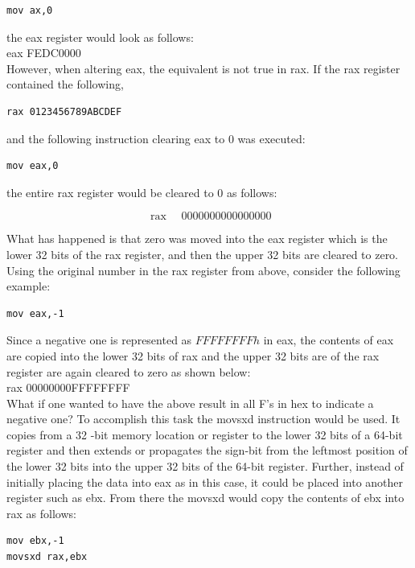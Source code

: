 \documentclass[10pt]{book}
\begin{document}
\begin{verbatim}
mov ax,0
\end{verbatim}

the eax register would look as follows:\\
eax FEDC0000\\
However, when altering eax, the equivalent is not true in rax. If the rax register contained the following,

\begin{verbatim}
rax 0123456789ABCDEF
\end{verbatim}

and the following instruction clearing eax to 0 was executed:

\begin{verbatim}
mov eax,0
\end{verbatim}

the entire rax register would be cleared to 0 as follows:

$$
\text { rax } \quad 0000000000000000
$$

What has happened is that zero was moved into the eax register which is the lower 32 bits of the rax register, and then the upper 32 bits are cleared to zero. Using the original number in the rax register from above, consider the following example:

\begin{verbatim}
mov eax,-1
\end{verbatim}

Since a negative one is represented as $F F F F F F F F h$ in eax, the contents of eax are copied into the lower 32 bits of rax and the upper 32 bits are of the rax register are again cleared to zero as shown below:\\
rax 00000000FFFFFFFF\\
What if one wanted to have the above result in all F's in hex to indicate a negative one? To accomplish this task the movsxd instruction would be used. It copies from a 32 -bit memory location or register to the lower 32 bits of a 64-bit register and then extends or propagates the sign-bit from the leftmost position of the lower 32 bits into the upper 32 bits of the 64-bit register. Further, instead of initially placing the data into eax as in this case, it could be placed into another register such as ebx. From there the movsxd would copy the contents of ebx into rax as follows:

\begin{verbatim}
mov ebx,-1
movsxd rax,ebx
\end{verbatim}
\end{document}
